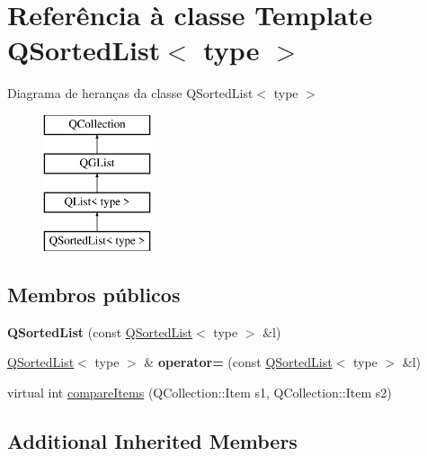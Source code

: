 \hypertarget{class_q_sorted_list}{\section{Referência à classe Template Q\-Sorted\-List$<$ type $>$}
\label{class_q_sorted_list}
}
Diagrama de heranças da classe Q\-Sorted\-List$<$ type $>$\begin{figure}[H]
\begin{center}
\leavevmode
\includegraphics[height=4.000000cm]{class_q_sorted_list}
\end{center}
\end{figure}
\subsection*{Membros públicos}
\begin{DoxyCompactItemize}
\item 
\hypertarget{class_q_sorted_list_a5b8f8d3fe3374462b806f5e55d003419}{{\bfseries Q\-Sorted\-List} (const \hyperlink{class_q_sorted_list}{Q\-Sorted\-List}$<$ type $>$ \&l)}\label{class_q_sorted_list_a5b8f8d3fe3374462b806f5e55d003419}

\item 
\hypertarget{class_q_sorted_list_a2cd1e0772bfdc86be6153fb14b78ef56}{\hyperlink{class_q_sorted_list}{Q\-Sorted\-List}$<$ type $>$ \& {\bfseries operator=} (const \hyperlink{class_q_sorted_list}{Q\-Sorted\-List}$<$ type $>$ \&l)}\label{class_q_sorted_list_a2cd1e0772bfdc86be6153fb14b78ef56}

\item 
virtual int \hyperlink{class_q_sorted_list_a9a682504b06f4a6e095c74ebce4bfbf1}{compare\-Items} (Q\-Collection\-::\-Item s1, Q\-Collection\-::\-Item s2)
\end{DoxyCompactItemize}
\subsection*{Additional Inherited Members}


